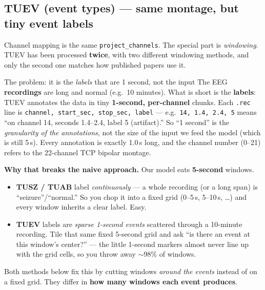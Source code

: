 \documentclass[11pt]{article}
\begin{document}
\subsection*{TUEV (event types) --- same montage, but tiny event labels}
Channel mapping is the same \texttt{project\_channels}. The special part is
\emph{windowing}. TUEV has been processed \textbf{twice}, with two different
windowing methods, and only the second one matches how published papers use it.

\begin{keybox}{The problem: it is the \emph{labels} that are 1 second, not the input}
The EEG \textbf{recordings} are long and normal (e.g.\ 10 minutes). What is short
is the \textbf{labels}: TUEV annotates the data in tiny \textbf{1-second,
per-channel} chunks. Each \texttt{.rec} line is
\texttt{channel, start\_sec, stop\_sec, label} --- e.g.\
\texttt{14, 1.4, 2.4, 5} means ``on channel 14, seconds 1.4--2.4, label 5
(artifact).'' So ``1 second'' is the \emph{granularity of the annotations}, not
the size of the input we feed the model (which is still 5\,s). Every annotation
is exactly 1.0\,s long, and the channel number (0--21) refers to the 22-channel
TCP bipolar montage.
\end{keybox}

\noindent\textbf{Why that breaks the naive approach.} Our model eats
\textbf{5-second} windows.
\begin{itemize}[nosep,leftmargin=1.4em]
  \item \textbf{TUSZ / TUAB} label \emph{continuously} --- a whole recording (or
  a long span) is ``seizure''/``normal.'' So you chop it into a fixed grid
  (0--5\,s, 5--10\,s, \dots) and every window inherits a clear label. Easy.
  \item \textbf{TUEV} labels are \emph{sparse 1-second events} scattered through
  a 10-minute recording. Tile that same fixed 5-second grid and ask ``is there an
  event at this window's center?'' --- the little 1-second markers almost never
  line up with the grid cells, so you throw away $\sim$98\% of windows.
\end{itemize}
Both methods below fix this by cutting windows \emph{around the events} instead
of on a fixed grid. They differ in \textbf{how many windows each event produces}.
\end{document}
